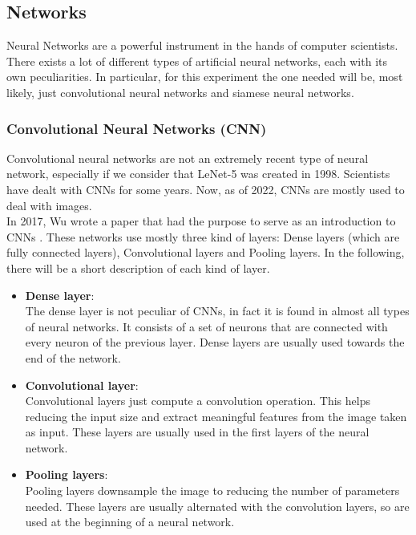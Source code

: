 \documentclass[conference]{IEEEtran}
\begin{document}
			\subsection{Networks}
			
				\noindent Neural Networks are a powerful instrument in the hands of computer scientists. There exists a lot of different types of artificial neural networks, each with its own peculiarities. In particular, for this 
				experiment the one needed will be, most likely, just convolutional neural networks and siamese neural networks. 
			
				\subsubsection{Convolutional Neural Networks (CNN)}
				
					Convolutional neural networks are not an extremely recent type of neural network, especially if we consider that LeNet-5 was created in 1998. Scientists have dealt with CNNs for some years. Now, as of 2022, 
					CNNs are mostly used to deal with images.\\
					In 2017, Wu wrote a paper that had the purpose to serve as an introduction to CNNs \cite{wu2017introduction}. These networks use mostly three kind of layers: Dense layers (which are fully connected layers), 
					Convolutional layers and Pooling layers. In the following, there will be a short description of each kind of layer. 
					\begin{itemize}
						
						\item \textbf{Dense layer}:\\
							The dense layer is not peculiar of CNNs, in fact it is found in almost all types of neural networks. It consists of a set of neurons that are connected with every neuron of the previous 
							layer. Dense layers are usually used towards the end of the network.
						
						\item \textbf{Convolutional layer}:\\
							Convolutional layers just compute a convolution operation. This helps reducing the input size and extract meaningful features from the image taken as input. These layers are usually used 
							in the first layers of the neural network.
						
						\item \textbf{Pooling layers}:\\
							Pooling layers downsample the image to reducing the number of parameters needed. These layers are usually alternated with the convolution layers, so are used at the beginning of a neural network.
							
					\end{itemize}
					
\end{document}
